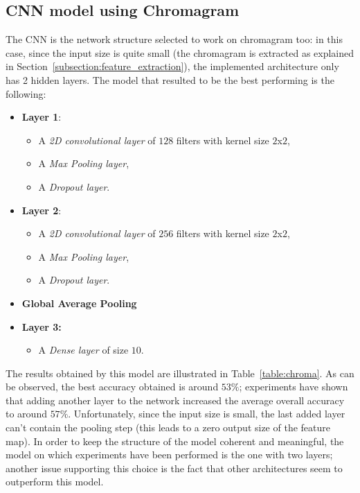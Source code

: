\documentclass[oneside,openany]{article}
\begin{document}
    \subsection{CNN model using Chromagram}
    \label{subsection:chroma_model}
    The CNN is the network structure selected to work on chromagram too: in this case, since the input size is quite small (the chromagram is extracted as explained in Section~\ref{subsection:feature_extraction}), the implemented architecture only has 2 hidden layers.
    The model that resulted to be the best performing is the following:
    \begin{itemize}
    \item \textbf{Layer 1}:
    \begin{itemize}
        \item A \textit{2D convolutional layer} of $128$ filters with kernel size $2$x$2$,
        \item A \textit{Max Pooling layer},
        \item A \textit{Dropout layer}.
    \end{itemize}
    \item \textbf{Layer 2}:
    \begin{itemize}
        \item A \textit{2D convolutional layer} of $256$ filters with kernel size $2$x$2$,
        \item A \textit{Max Pooling layer},
        \item A \textit{Dropout layer}.
    \end{itemize}
    \item \textbf{Global Average Pooling}
    \item \textbf{Layer 3:}
    \begin{itemize}
        \item A \textit{Dense layer} of size $10$.
    \end{itemize}
    \end{itemize}
    The results obtained by this model are illustrated in Table~\ref{table:chroma}.
    As can be observed, the best accuracy obtained is around $53\%$; experiments have shown that adding another layer to the network increased the average overall accuracy to around $57\%$. Unfortunately, since the input size is small, the last added layer can't contain the pooling step (this leads to a zero output size of the feature map). In order to keep the structure of the model coherent and meaningful, the model on which experiments have been performed is the one with two layers; another issue supporting this choice is the fact that other architectures seem to outperform this model.
    
\end{document}
